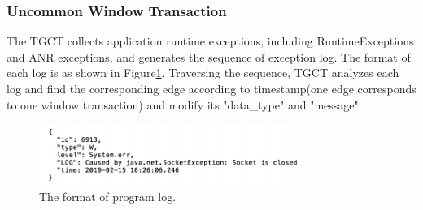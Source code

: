 
\subsubsection{Uncommon Window Transaction}
The TGCT collects application runtime exceptions, including RuntimeExceptions and ANR exceptions, and generates the sequence of exception log. The format of each log is as shown in Figure\ref{fig:foramt2}.
Traversing the sequence, TGCT analyzes each log and find the corresponding edge according to timestamp(one edge corresponds to one window transaction) and modify its "data\_type" and "message".

\begin{figure}[htbp]
\centering
\centerline{\includegraphics[width=\columnwidth,height=2cm]{fig/5.png}}
\caption{The format of program log.}
\label{fig:foramt2}
\end{figure}

